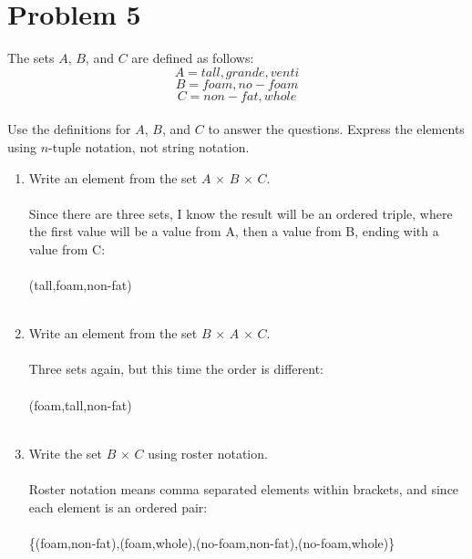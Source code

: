\documentclass{amsart}
\theoremstyle{definition}
\theoremstyle{Exercise}
\theoremstyle{remark}
\theoremstyle{rule}
\numberwithin{equation}{section}
\begin{document}
 \newpage


\section*{Problem 5}
The sets $A$, $B$, and $C$ are defined as follows:\\

\[A = {tall, grande, venti}\]
\[B = {foam, no-foam}\]
\[C = {non-fat, whole}\]\\
Use the definitions for $A$, $B$, and $C$ to answer the questions. Express the elements using $n$-tuple notation, not string notation.\\
\begin{enumerate}[label=(\alph*)]
  \item Write an element from the set $A\, \times \,B \, \times \,C$.\\\\
Since there are three sets, I know the result will be an ordered triple, where the first value will be a value from A, then a value from B, ending with a value from C:\\\\
(tall,foam,non-fat)
\\\\
  \item Write an element from the set $B\, \times \,A \, \times \,C$.\\\\
Three sets again, but this time the order is different:\\\\
(foam,tall,non-fat)
\\\\
  \item Write the set $B \, \times \,C$ using roster notation.\\\\
Roster notation means comma separated elements within brackets, and since each element is an ordered pair:\\\\
\{(foam,non-fat),(foam,whole),(no-foam,non-fat),(no-foam,whole)\}
\\\\
\end{enumerate}
\end{document}
